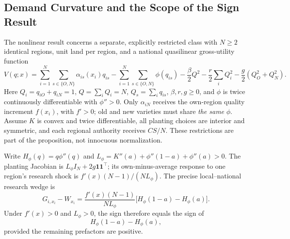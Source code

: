 \documentclass[USenglish]{article}
\begin{document}
\subsection{Demand Curvature and the Scope of the Sign Result}
The nonlinear result concerns a separate, explicitly restricted class with $N\geq2$ identical regions, unit land per region, and a national quasilinear gross-utility function
\begin{equation}
V(q;x)=\sum_{i=1}^{N}\sum_{s\in\{O,N\}}\alpha_{is}(x_i)q_{is}
-\sum_{i=1}^{N}\sum_{s\in\{O,N\}}\phi(q_{is})
-\frac{\beta}{2}Q^2-\frac{r}{2}\sum_iQ_i^2
-\frac{g}{2}(Q_O^2+Q_N^2).
\label{eq:nonlinearutility}
\end{equation}
Here $Q_i=q_{iO}+q_{iN}=1$, $Q=\sum_iQ_i=N$, $Q_s=\sum_iq_{is}$, $\beta,r,g\geq0$, and $\phi$ is twice continuously differentiable with $\phi''>0$. Only $\alpha_{iN}$ receives the own-region quality increment $f(x_i)$, with $f'>0$; old and new varieties must share \emph{the same} $\phi$. Assume $K$ is convex and twice differentiable, all planting choices are interior and symmetric, and each regional authority receives $CS/N$. These restrictions are part of the proposition, not innocuous normalization.

Write $H_\phi(q)=q\phi''(q)$ and $L_\phi=K''(a)+\phi''(1-a)+\phi''(a)>0$. The planting Jacobian is $L_\phi I_N+2g\mathbf1\mathbf1^\top$; its own-minus-average response to one region's research shock is $f'(x)(N-1)/(NL_\phi)$. The precise local--national research wedge is
\begin{equation}
G_{i,x_i}-W_{x_i}
=\frac{f'(x)(N-1)}{NL_\phi}
\bigl[H_\phi(1-a)-H_\phi(a)\bigr].
\label{eq:nonlinearwedge}
\end{equation}
Under $f'(x)>0$ and $L_\phi>0$, the sign therefore equals the sign of
\begin{equation}
 H_\phi(1-a)-H_\phi(a),
 \label{eq:curvature}
\end{equation}
provided the remaining prefactors are positive.
\end{document}
